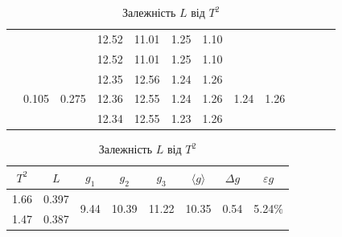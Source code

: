 \documentclass[a4paper,12pt]{article}
\begin{document}
\begin{table}[htp]
\begin{tabular}{|c|c|c|c|c|c|c|c|c|c|c|c|c|}
                    &                        &                        & 12.52 & 11.01 & 1.25  & 1.10  &                       &                       &                             &                        &                        &                            \\ \cline{4-7}
                    &                        &                        & 12.52 & 11.01 & 1.25  & 1.10  &                       &                       &                             &                        &                        &                            \\ \cline{2-9}
                    & \multirow{3}{*}{0.105} & \multirow{3}{*}{0.275} & 12.35 & 12.56 & 1.24  & 1.26  & \multirow{3}{*}{1.24} & \multirow{3}{*}{1.26} &                             &                        &                        &                            \\ \cline{4-7}
                    &                        &                        & 12.36 & 12.55 & 1.24  & 1.26  &                       &                       &                             &                        &                        &                            \\ \cline{4-7}
                    &                        &                        & 12.34 & 12.55 & 1.23  & 1.26  &                       &                       &                             &                        &                        &                            \\ \hline
\end{tabular}
\caption{Залежність $L$ від $T^2$}
\begin{tabular}{|cccccccc|}
\hline
\multicolumn{1}{|c|}{$T^2$} & \multicolumn{1}{c|}{$L$}   & \multicolumn{1}{c|}{$g_1$}                 & \multicolumn{1}{c|}{$g_2$}                  & \multicolumn{1}{c|}{$g_3$}                  & \multicolumn{1}{c|}{$\langle g\rangle$}     & \multicolumn{1}{c|}{$\Delta g$}            & $\varepsilon g$           \\ \hline
\multicolumn{1}{|c|}{1.66}  & \multicolumn{1}{c|}{0.397} & \multicolumn{1}{c|}{\multirow{3}{*}{9.44}} & \multicolumn{1}{c|}{\multirow{3}{*}{10.39}} & \multicolumn{1}{c|}{\multirow{3}{*}{11.22}} & \multicolumn{1}{c|}{\multirow{3}{*}{10.35}} & \multicolumn{1}{c|}{\multirow{3}{*}{0.54}} & \multirow{3}{*}{5.24$\%$} \\ \cline{1-2}
\multicolumn{1}{|c|}{1.47}  & \multicolumn{1}{c|}{0.387} & \multicolumn{1}{c|}{}                      & \multicolumn{1}{c|}{}                       & \multicolumn{1}{c|}{}                       & \multicolumn{1}{c|}{}                       & \multicolumn{1}{c|}{}                      &                           \\ \cline{1-2}

\end{tabular}
\end{table}
\end{document}
